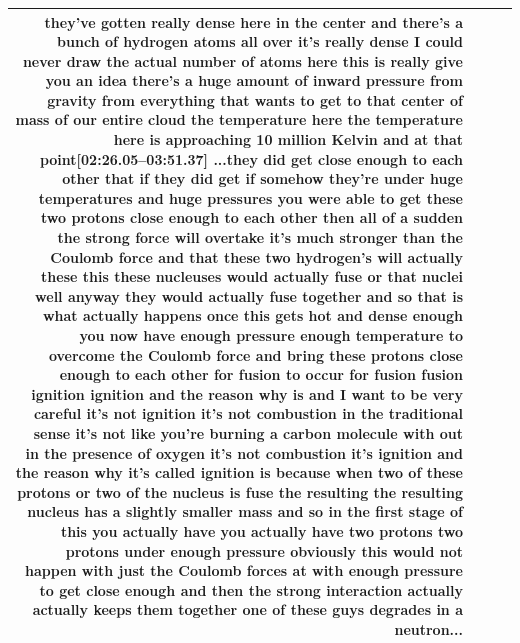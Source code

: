 \documentclass[10pt]{article}
\begin{document}
\begin{tiny}
\begin{longtable}{|r|p{0.375in}|p{1.275in}|p{3.5in}|}
they've gotten really dense here in the center and there's a bunch of hydrogen atoms all over it's really dense I could never draw the actual number of atoms here this is really give you an idea there's a huge amount of inward pressure from gravity from everything that wants to get to that center of mass of our entire cloud the temperature here the temperature here is approaching 10 million Kelvin and at that point\newline\textbf{[02:26.05--03:51.37]} ...they did get close enough to each other that if they did get if somehow they're under huge temperatures and huge pressures you were able to get these two protons close enough to each other then all of a sudden the strong force will overtake it's much stronger than the Coulomb force and that these two hydrogen's will actually these this these nucleuses would actually fuse or that nuclei well anyway they would actually fuse together and so that is what actually happens once this gets hot and dense enough you now have enough pressure enough temperature to overcome the Coulomb force and bring these protons close enough to each other for fusion to occur for fusion fusion ignition ignition and the reason why is and I want to be very careful it's not ignition it's not combustion in the traditional sense it's not like you're burning a carbon molecule with out in the presence of oxygen it's not combustion it's ignition and the reason why it's called ignition is because when two of these protons or two of the nucleus is fuse the resulting the resulting nucleus has a slightly smaller mass and so in the first stage of this you actually have you actually have two protons two protons under enough pressure obviously this would not happen with just the Coulomb forces at with enough pressure to get close enough and then the strong interaction actually actually keeps them together one of these guys degrades in a neutron... \\\hline

\end{longtable}
\end{tiny}
\end{document}
